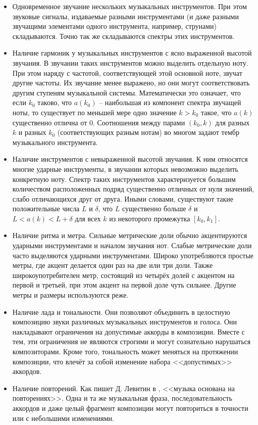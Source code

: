 \begin{itemize}
  \item Одновременное звучание нескольких музыкальных инструментов. При этом
  звуковые сигналы, издаваемые разными инструментами (и даже разными звучащими
  элементами одного инструмента, например, струнами) складываются. Точно так же
  складываются спектры этих инструментов.
  
  \item Наличие гармоник у музыкальных инструментов с ясно выраженной высотой
  звучания. В звучании таких инструментов можно выделить отдельную ноту. При
  этом наряду с частотой, соответствующей этой основной ноте, звучат другие
  частоты. Их звучание менее выражено, но они могут соответствовать другим
  ступеням музыкальной системы. Математически это означает, что если $k_0$
  таково, что $a(k_0)$ -- наибольшая из компонент спектра звучащей ноты, то
  существует по меньшей мере одно значение $k > k_0$ такое, что $a(k)$
  существенно отлична от 0. Соотношения между парами $(k_0, k)$ для разных $k$ и
  разных $k_0$ (соответствующих разным нотам) во многом задают тембр
  музыкального инструмента.
  
  \item Наличие инструментов с невыраженной высотой звучания. К ним относятся
  многие ударные инструменты, в звучании которых невозможно выделить конкретную
  ноту. Спектр таких инструментов характеризуется большим количеством
  расположенных подряд существенно отличных от нуля значений, слабо отличающихся
  друг от друга. Иными словами, существуют такие положительные числа $L$ и
  $\delta$, что $L$ существенно больше $\delta$ и $L < a(k) < L + \delta$ для
  всех $k$ из некоторого промежутка $[k_0, k_1]$.
  
  \item Наличие ритма и метра. Сильные метрические доли обычно акцентируются
  ударными инструментами и началом звучания нот. Слабые метрические доли часто
  выделяются ударными инструментами. Широко употребляются простые метры, где
  акцент делается один раз на две или три доли. Также широкоупотребителен метр,
  состоящий из четырёх долей с акцентом на первой и третьей, при этом акцент на
  первой доле чуть сильнее. Другие метры и размеры используются реже.
  
  \item Наличие лада и тональности. Они позволяют объединить в целостную
  композицию звуки различных музыкальных инструментов и голоса. Они накладывают
  ограничения на допустимые аккорды в композиции. Вместе с тем, эти ограничения
  не являются строгими и могут сознательно нарушаться композиторами. Кроме того,
  тональность может меняться на протяжении композиции, что влечёт за собой
  изменение набора <<допустимых>> аккордов.
  
  \item Наличие повторений. Как пишет Д. Левитин в \cite{Levitin2006},
  <<музыка основана на повторениях>>. Одна и та же музыкальная фраза,
  последовательность аккордов и даже целый фрагмент композиции могут повториться
  в точности или с небольшими изменениями.
\end{itemize}

